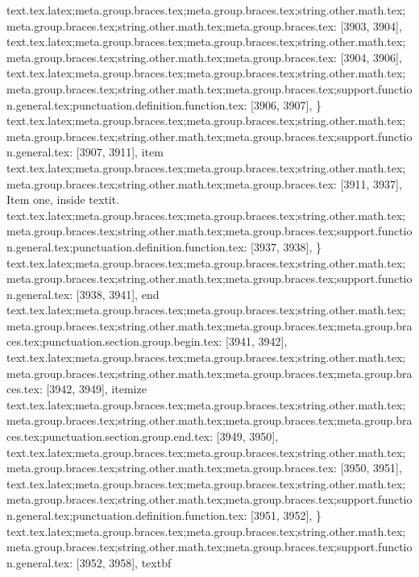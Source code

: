 {{{{{{{{{{{{{{{{{{{{{{{{{{{{{{{{{{{{{{{{{{{{{{{{{{{{{{{{{{{{{{{{{{{{{{{{{{{{{{{{{{{{{{{{{{{{{{{{{{{{{{{{{{{{{{{{{{{{{{{{{{{{text.tex.latex;meta.group.braces.tex;meta.group.braces.tex;string.other.math.tex;meta.group.braces.tex;string.other.math.tex;meta.group.braces.tex: [3903, 3904], {
}
text.tex.latex;meta.group.braces.tex;meta.group.braces.tex;string.other.math.tex;meta.group.braces.tex;string.other.math.tex;meta.group.braces.tex: [3904, 3906], {  }
text.tex.latex;meta.group.braces.tex;meta.group.braces.tex;string.other.math.tex;meta.group.braces.tex;string.other.math.tex;meta.group.braces.tex;support.function.general.tex;punctuation.definition.function.tex: [3906, 3907], {\}
text.tex.latex;meta.group.braces.tex;meta.group.braces.tex;string.other.math.tex;meta.group.braces.tex;string.other.math.tex;meta.group.braces.tex;support.function.general.tex: [3907, 3911], {item}
text.tex.latex;meta.group.braces.tex;meta.group.braces.tex;string.other.math.tex;meta.group.braces.tex;string.other.math.tex;meta.group.braces.tex: [3911, 3937], { Item one, inside textit.
}
text.tex.latex;meta.group.braces.tex;meta.group.braces.tex;string.other.math.tex;meta.group.braces.tex;string.other.math.tex;meta.group.braces.tex;support.function.general.tex;punctuation.definition.function.tex: [3937, 3938], {\}
text.tex.latex;meta.group.braces.tex;meta.group.braces.tex;string.other.math.tex;meta.group.braces.tex;string.other.math.tex;meta.group.braces.tex;support.function.general.tex: [3938, 3941], {end}
text.tex.latex;meta.group.braces.tex;meta.group.braces.tex;string.other.math.tex;meta.group.braces.tex;string.other.math.tex;meta.group.braces.tex;meta.group.braces.tex;punctuation.section.group.begin.tex: [3941, 3942], {{}
text.tex.latex;meta.group.braces.tex;meta.group.braces.tex;string.other.math.tex;meta.group.braces.tex;string.other.math.tex;meta.group.braces.tex;meta.group.braces.tex: [3942, 3949], {itemize}
text.tex.latex;meta.group.braces.tex;meta.group.braces.tex;string.other.math.tex;meta.group.braces.tex;string.other.math.tex;meta.group.braces.tex;meta.group.braces.tex;punctuation.section.group.end.tex: [3949, 3950], {}}
text.tex.latex;meta.group.braces.tex;meta.group.braces.tex;string.other.math.tex;meta.group.braces.tex;string.other.math.tex;meta.group.braces.tex: [3950, 3951], {
}
text.tex.latex;meta.group.braces.tex;meta.group.braces.tex;string.other.math.tex;meta.group.braces.tex;string.other.math.tex;meta.group.braces.tex;support.function.general.tex;punctuation.definition.function.tex: [3951, 3952], {\}
text.tex.latex;meta.group.braces.tex;meta.group.braces.tex;string.other.math.tex;meta.group.braces.tex;string.other.math.tex;meta.group.braces.tex;support.function.general.tex: [3952, 3958], {textbf}
}}}}}}}}}}}}}}}}}}}}}}}}}}}}}}}}}}}}}}}}}}}}}}}}}}}}}}}}}}}}}}}}}}}}}}}}}}}}}}}}}}}}}}}}}}}}}}}}}}}}}}}}}}}}}}}}}}}}}}}}}}}}}}}
